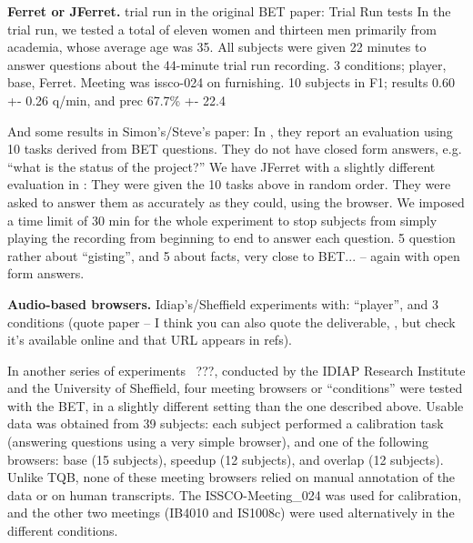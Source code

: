 \documentclass[11pt]{article}
\begin{document}
\textbf{Ferret or JFerret.} 
trial run in the original BET paper:
Trial Run tests
In the trial run, we tested a total of eleven women and thirteen
men primarily from academia, whose average age was
35. All subjects were given 22 minutes to answer questions
about the 44-minute trial run recording.  3 conditions; player, base, Ferret.  Meeting was issco-024 on furnishing.
10 subjects in F1; results 0.60 +- 0.26 q/min, and prec 67.7\% +- 22.4

And some results in Simon's/Steve's paper: In \cite{whittaker-puc08}, they report an evaluation using 10 tasks derived from BET questions.  They do not have closed form answers, e.g. ``what is the status of the project?'' We have JFerret with a slightly different evaluation in \cite[p.~210-211]{whittaker-puc08}: They were given the 10 tasks above in random order.  They were asked to answer them as accurately as they could, using the browser. We imposed a time limit of 30 min for the whole experiment to stop subjects from simply playing the recording from beginning to end to
answer each question.  5 question rather about ``gisting'', and 5 about facts, very close to BET... -- again with open form answers.


\textbf{Audio-based browsers.}
Idiap's/Sheffield experiments with: ``player'', and 3 conditions (quote paper -- I think you can also quote the deliverable, \cite{ami-d64}, but check it's available online and that URL appears in refs).

In another series of experiments~\cite{ami-d64} ???, conducted by the IDIAP Research Institute and the University of Sheffield, four meeting browsers or ``conditions'' were tested with the BET, in a slightly different setting than the one described above.  Usable data was obtained from 39 subjects: each subject performed a calibration task (answering questions using a very simple browser), and one of the following browsers: base (15 subjects), speedup (12 subjects), and overlap (12 subjects).  Unlike TQB, none of these meeting browsers relied on manual annotation of the data or on human transcripts.  The ISSCO-Meeting\_024 was used for calibration, and the other two meetings (IB4010 and IS1008c) were used alternatively in the different conditions.
\end{document}
